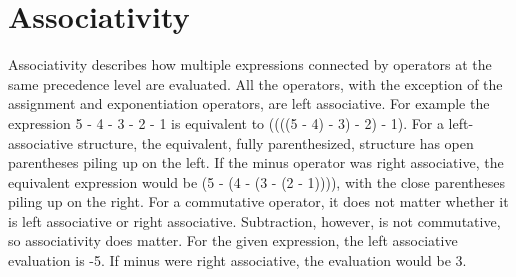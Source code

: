 \section{Associativity}

Associativity describes how multiple expressions connected by operators at the same
precedence level are evaluated. All the operators, with the exception of
the assignment and exponentiation operators, are left associative.
For example the expression
5 - 4 - 3 - 2 - 1 is equivalent to ((((5 - 4) - 3) - 2) - 1). For
a left-associative structure, the equivalent, fully parenthesized,
structure has open parentheses piling up on the left. If the minus
operator was right associative, the equivalent expression would be
(5 - (4 - (3 - (2 - 1)))), with the close parentheses piling up on
the right. For a commutative operator, it does not matter whether it
is left associative or right associative. Subtraction, however, is not
commutative, so associativity does matter. For the given expression, the
left associative evaluation is -5. If minus were right associative, the
evaluation would be 3. 
